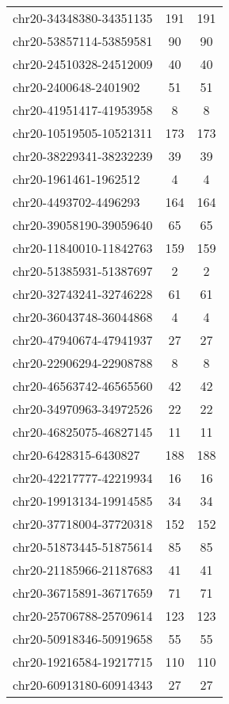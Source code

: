 \documentclass[10pt,letterpaper]{article}
\begin{document}
{\begin{longtable}{lSS}
	chr20-34348380-34351135 & 191    & 191      \\
	chr20-53857114-53859581 & 90     & 90       \\
	chr20-24510328-24512009 & 40     & 40       \\
	chr20-2400648-2401902   & 51     & 51       \\
	chr20-41951417-41953958 & 8      & 8        \\
	chr20-10519505-10521311 & 173    & 173      \\
	chr20-38229341-38232239 & 39     & 39       \\
	chr20-1961461-1962512   & 4      & 4        \\
	chr20-4493702-4496293   & 164    & 164      \\
	chr20-39058190-39059640 & 65     & 65       \\
	chr20-11840010-11842763 & 159    & 159      \\
	chr20-51385931-51387697 & 2      & 2        \\
	chr20-32743241-32746228 & 61     & 61       \\
	chr20-36043748-36044868 & 4      & 4        \\
	chr20-47940674-47941937 & 27     & 27       \\
	chr20-22906294-22908788 & 8      & 8        \\
	chr20-46563742-46565560 & 42     & 42       \\
	chr20-34970963-34972526 & 22     & 22       \\
	chr20-46825075-46827145 & 11     & 11       \\
	chr20-6428315-6430827   & 188    & 188      \\
	chr20-42217777-42219934 & 16     & 16       \\
	chr20-19913134-19914585 & 34     & 34       \\
	chr20-37718004-37720318 & 152    & 152      \\
	chr20-51873445-51875614 & 85     & 85       \\
	chr20-21185966-21187683 & 41     & 41       \\
	chr20-36715891-36717659 & 71     & 71       \\
	chr20-25706788-25709614 & 123    & 123      \\
	chr20-50918346-50919658 & 55     & 55       \\
	chr20-19216584-19217715 & 110    & 110      \\
	chr20-60913180-60914343 & 27     & 27       \\

\end{longtable}}
\end{document}

